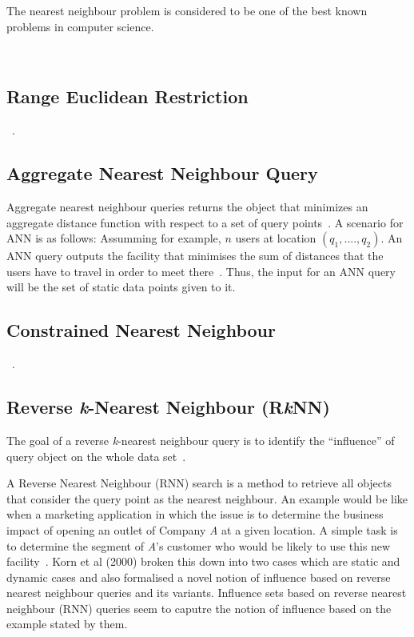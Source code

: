 \documentclass[a4paper,11pt]{article}
\begin{document}
~\cite{jensen2003nearest}

~\cite{preparatat1985computational}

The nearest neighbour problem is considered to be one of the best known problems in computer science. 

~\cite{roussopoulos1995nearest}

\subsection{Range Euclidean Restriction}

~\cite{papadias2003query}. 

\subsection{Aggregate Nearest Neighbour Query}

Aggregate nearest neighbour queries returns the object that minimizes an aggregate distance function with respect to a set of query points~\cite{yiu2005aggregate}. A scenario for ANN is as follows: Assumming for example, $n$ users at location $(q_1,....,q_2)$. An ANN query outputs the facility that minimises the sum of distances that the users have to travel in order to meet there~\cite{papadias2005aggregate}. Thus, the input for an ANN query will be the set of static data points given to it.

\subsection{Constrained Nearest Neighbour}

~\cite{ferhatosmanoglu2001constrained}.

\subsection{Reverse \textit{k}-Nearest Neighbour (R\textit{k}NN)}

The goal of a reverse \textit{k}-nearest neighbour query is to identify the ``influence'' of query object on the whole data set~\cite{achtert2006efficient}. 

A Reverse Nearest Neighbour (RNN) search is a method to retrieve all objects that consider the query point as the nearest neighbour. An example would be like when a marketing application in which the issue is to determine the business impact of opening an outlet of Company \textit{A} at a given location. A simple task is to determine the segment of \textit{A}'s customer who would be likely to use this new facility~\cite{korn2000influence}. Korn et al (2000) broken this down into two cases which are static and dynamic cases and also formalised a novel notion of influence based on reverse nearest neighbour queries and its variants. Influence sets based on reverse nearest neighbour (RNN) queries seem to caputre the notion of influence based on the example stated by them.
\end{document}
